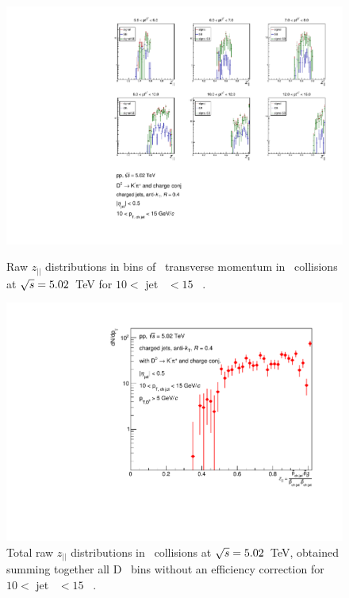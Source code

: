 \begin{figure}[bth]
\centering
\begin{minipage}{.65\textwidth}
  \centering
\includegraphics[width=\textwidth]{pp_2sig/R4_jetbin_10_15/jetRawSpectrum_pTD5}
\caption{Raw $z_{||}$ distributions in bins of \Dzero\ transverse momentum in \pp\ collisions at $\sqrt{s}=5.02$~TeV for $10<$ jet \pt\ $<15$ \GeVc\ .}
\label{fig:eq_pp_signBkgJet_Dzero_10_15_R4}
\end{minipage}%
\begin{minipage}{.4\textwidth}
  \centering
\includegraphics[width=\textwidth]{pp_2sig/R4_jetbin_10_15/jetPtSpectrum_SB_pTD5}
\caption{Total raw $z_{||}$ distributions in \pp\ collisions at $\sqrt{s}=5.02$~TeV, obtained summing together all D \pt\ bins without an efficiency correction for $10<$ jet \pt\ $<15$ \GeVc\ .
}
\label{fig:eq_pp_signBkgJet_tot_10_15_R4}
\end{minipage}
\end{figure}
